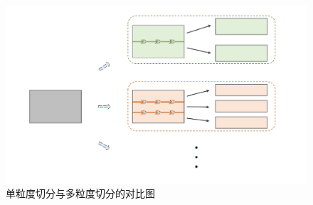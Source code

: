 \begin{figure}[h]
  \centering
  \includegraphics[width=1\linewidth]{Img/sg-mg.pdf}
  \caption{单粒度切分与多粒度切分的对比图}
  \label{fig:sg-mg}
\end{figure}
